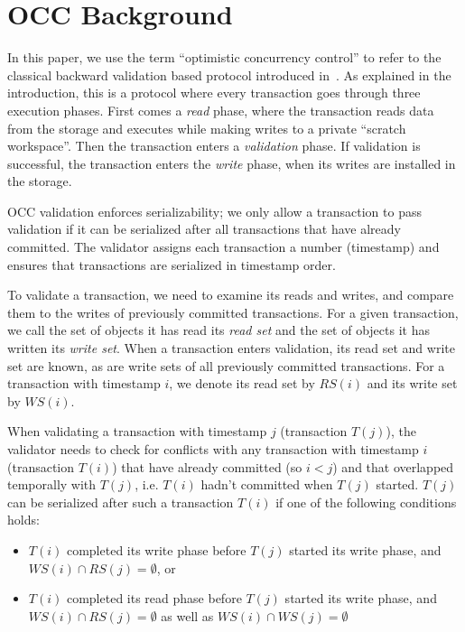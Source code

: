 \section{OCC Background}\label{sec:background}

In this paper, we use the term ``optimistic concurrency control'' to refer to the classical backward validation based protocol introduced in~\cite{kung81tods}. As explained in the introduction, this is a protocol where every transaction goes through three execution phases. First comes a \emph{read} phase, where the transaction reads data from the storage and executes while making writes to a private ``scratch workspace''. Then the transaction enters a \emph{validation} phase. If validation is successful, the transaction enters the \emph{write} phase, when its writes are installed in the storage. 

OCC validation enforces serializability; we only allow a transaction to pass validation if it can be serialized after all transactions that have already committed. The validator assigns each transaction a number (timestamp) and ensures that transactions are serialized in timestamp order.

To validate a transaction, we need to examine its reads and writes, and compare them to the writes of previously committed transactions. For a given transaction, we call the set of objects it has read its \emph{read set} and the set of objects it has written its \emph{write set}. When a transaction enters validation, its read set and write set are known, as are write sets of all previously committed transactions. For a transaction with timestamp $i$, we denote its read set by $RS(i)$ and its write set by $WS(i)$.

When validating a transaction with timestamp $j$ (transaction $T(j)$), the validator needs to check for conflicts with any transaction with timestamp $i$ (transaction $T(i)$) that have already committed (so $i < j$) and that overlapped temporally with $T(j)$, i.e. $T(i)$ hadn't committed when $T(j)$ started. 
$T(j)$ can be serialized after such a transaction $T(i)$ if one of the following conditions holds:
\begin{itemize}
\item $T(i)$ completed its write phase before $T(j)$ started its write phase, and $WS(i) \cap RS(j) = \emptyset$, or
\item $T(i)$ completed its read phase before $T(j)$ started its write phase, and $WS(i) \cap RS(j) = \emptyset$ as well as $WS(i) \cap WS(j) = \emptyset$
\end{itemize}

